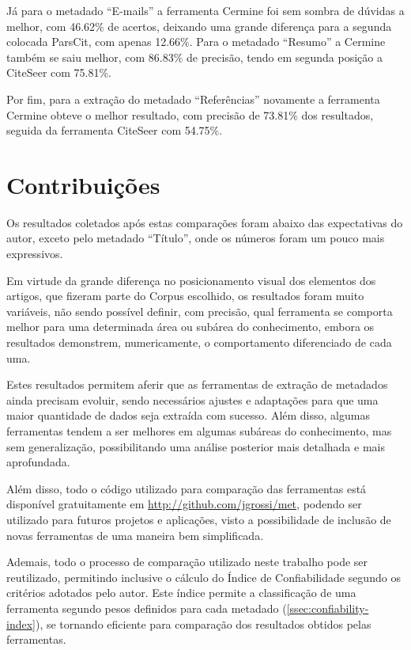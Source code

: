 Já para o metadado ``E-mails'' a ferramenta Cermine foi sem sombra de dúvidas a melhor, com 46.62\% de acertos, deixando uma grande diferença para a segunda colocada ParsCit, com apenas 12.66\%. Para o metadado ``Resumo'' a Cermine também se saiu melhor, com 86.83\% de precisão, tendo em segunda posição a CiteSeer com 75.81\%.

Por fim, para a extração do metadado ``Referências'' novamente a ferramenta Cermine obteve o melhor resultado, com precisão de 73.81\% dos resultados, seguida da ferramenta CiteSeer com 54.75\%.

\section{Contribuições}
\label{sec:contributions}

Os resultados coletados após estas comparações foram abaixo das expectativas do autor, exceto pelo metadado ``Título'', onde os números foram um pouco mais expressivos.

Em virtude da grande diferença no posicionamento visual dos elementos dos artigos, que fizeram parte do Corpus escolhido, os resultados foram muito variáveis, não sendo possível definir, com precisão, qual ferramenta se comporta melhor para uma determinada área ou subárea do conhecimento, embora os resultados demonstrem, numericamente, o comportamento diferenciado de cada uma.

Estes resultados permitem aferir que as ferramentas de extração de metadados ainda precisam evoluir, sendo necessários ajustes e adaptações para que uma maior quantidade de dados seja extraída com sucesso. Além disso, algumas ferramentas tendem a ser melhores em algumas subáreas do conhecimento, mas sem generalização, possibilitando uma análise posterior mais detalhada e mais aprofundada.

Além disso, todo o código utilizado para comparação das ferramentas está disponível gratuitamente em \url{http://github.com/jgrossi/met}, podendo ser utilizado para futuros projetos e aplicações, visto a possibilidade de inclusão de novas ferramentas de uma maneira bem simplificada.

Ademais, todo o processo de comparação utilizado neste trabalho pode ser reutilizado, permitindo inclusive o cálculo do Índice de Confiabilidade segundo os critérios adotados pelo autor. Este índice permite a classificação de uma ferramenta segundo pesos definidos para cada metadado (\autoref{ssec:confiability-index}), se tornando eficiente para comparação dos resultados obtidos pelas ferramentas.

